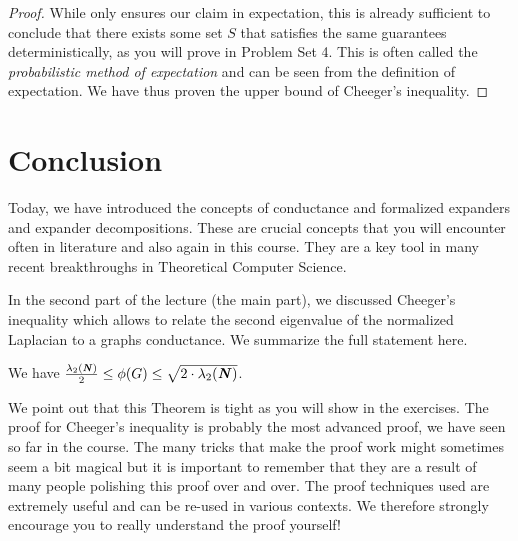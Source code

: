 \begin{proof}
While  only ensures our claim in expectation, this is already sufficient to conclude that there exists some set $S$ that satisfies the same guarantees deterministically, as you will prove in Problem Set 4. This is often called the \emph{probabilistic method of expectation} and can be seen from the definition of expectation. We have thus proven the upper bound of Cheeger's inequality.
\end{proof}

\section{Conclusion}

Today, we have introduced the concepts of conductance and formalized expanders and expander decompositions. These are crucial concepts that you will encounter often in literature and also again in this course. They are a key tool in many recent breakthroughs in Theoretical Computer Science.

In the second part of the lecture (the main part), we discussed Cheeger's inequality which allows to relate the second eigenvalue of the normalized Laplacian to a graphs conductance. We summarize the full statement here.

\begin{theorem}\label{thm:cheegerInequFull}
We have $\frac{\lambda_2(\boldsymbol{\mathit{N}})}{2} \leq \phi(G) \leq \sqrt{2 \cdot \lambda_2(\boldsymbol{\mathit{N}})}$.
\end{theorem}

We point out that this Theorem is tight as you will show in the exercises. The proof for Cheeger's inequality is probably the most advanced proof, we have seen so far in the course. The many tricks that make the proof work might sometimes seem a bit magical but it is important to remember that they are a result of many people polishing this proof over and over. The proof techniques used are extremely useful and can be re-used in various contexts. We therefore strongly encourage you to really understand the proof yourself!
